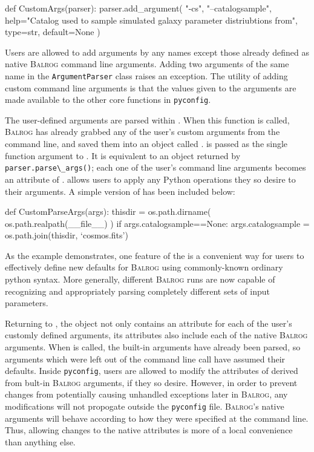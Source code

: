\documentclass[12pt]{book}
\newcommand{\codett}[1]{\lstinline{#1}}
\newcommand{\py}{Python}
\newcommand{\pyconfig}{\codett{pyconfig}}
\newcommand{\balrog}{\textsc{Balrog}}
\begin{document}
\begin{code}
def CustomArgs(parser):
    parser.add_argument( "-cs", "--catalogsample", help="Catalog used to sample simulated galaxy parameter distriubtions from", type=str, default=None )
\end{code}

\noindent Users are allowed to add arguments by any names except those already defined as native \balrog{} command line arguments.
Adding two arguments of the same name in the \codett{ArgumentParser} class raises an exception.
The utility of adding custom command line arguments is that the values given to the arguments
are made available to the other core functions in \pyconfig{}.

The user-defined arguments are parsed within \parsefunc{}.
When this function is called, 
\balrog{} has already grabbed any of the user's custom arguments from the command line,
and saved them into an object called \parseargs{}.
\parseargs{} is passed as the single function argument to \parsefunc{}.
It is equivalent to an object returned by \codett{parser.parse\_args()};
each one of the user's command line arguments becomes an attribute of \parseargs{}. 
\parsefunc{} allows users to apply any \py{} operations they so desire to their arguments.
A simple version of \parsefunc{} has been included below:

\begin{code}
def CustomParseArgs(args):
    thisdir = os.path.dirname( os.path.realpath(__file__) )
    if args.catalogsample==None:
        args.catalogsample = os.path.join(thisdir, `cosmos.fits')
\end{code}

\noindent As the example demonstrates, one feature of the \parsefunc{} is a convenient
way for users to effectively define new defaults for \balrog{} using
commonly-known ordinary python syntax.
More generally, different \balrog{} runs are now capable of recognizing and appropriately parsing
completely different sets of input parameters. 

Returning to \parseargs{},
the object not only contains an attribute for each of the user's customly defined arguments,
its attributes also include each of the native \balrog{} arguments.
When \parsefunc{} is called, the built-in arguments have already been parsed,
so arguments which were left out of the command line call have assumed their defaults.
Inside \pyconfig{}, users are allowed to modify the attributes of \parseargs{} derived from bult-in \balrog{} arguments, 
if they so desire.
However, in order to prevent changes from potentially causing unhandled exceptions later in \balrog{},
any modifications will not propogate outside the \pyconfig{} file.
\balrog{}'s native arguments will behave according to how they were specified at the command line.
Thus, allowing changes to the native attributes is more of a local convenience than anything else.
\end{document}
